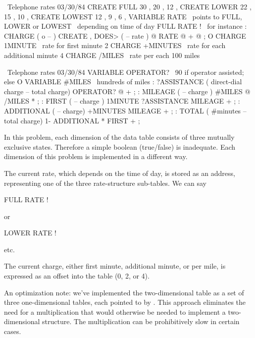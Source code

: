 \begin{figure*}[bbbt]
\begin{Screen}
\ Telephone rates                                       03/30/84
CREATE FULL     30 , 20 , 12 ,
CREATE LOWER    22 , 15 , 10 ,
CREATE LOWEST   12 ,  9 ,  6 ,
VARIABLE RATE   \ points to FULL, LOWER or LOWEST
                \ depending on time of day
FULL RATE !  \ for instance
: CHARGE   ( o -- ) CREATE ,
   DOES>  ( -- rate )  @  RATE @ +  @ ;
O CHARGE 1MINUTE   \ rate for first minute
2 CHARGE +MINUTES  \ rate for each additional minute
4 CHARGE /MILES    \ rate per each 100 miles
\end{Screen}

\begin{Screen}
\ Telephone rates                                       03/30/84
VARIABLE OPERATOR?  \ 90 if operator assisted; else O
VARIABLE #MILES  \ hundreds of miles
: ?ASSISTANCE  ( direct-dial charge -- total charge)
   OPERATOR? @  + ;
: MILEAGE  ( -- charge )  #MILES @  /MILES * ;
: FIRST  ( -- charge )  1MINUTE  ?ASSISTANCE  MILEAGE + ;
: ADDITIONAL  ( -- charge)  +MINUTES  MILEAGE + ;
: TOTAL ( #minutes -- total charge)
   1- ADDITIONAL *  FIRST + ;
\end{Screen}
\end{figure*}

In this problem, each dimension of the data table consists of three
mutually exclusive states. Therefore a simple boolean (true/false) is
inadequate. Each dimension of this problem is implemented in a different
way.

The current rate, which depends on the time of day, is stored as an
address, representing one of the three rate-structure sub-tables. We can
say
\begin{Code}
FULL RATE !
\end{Code}
or
\begin{Code}
LOWER RATE !
\end{Code}
etc.\goodbreak

The current charge, either first minute, additional minute, or per mile,
is expressed as an offset into the table (0, 2, or 4).

An optimization note: we've implemented the two-dimensional table as a set
of three one-dimensional tables, each pointed to by . This
approach eliminates the need for a multiplication that would otherwise be
needed to implement a two-dimensional structure. The multiplication can be
prohibitively slow in certain cases.%
%

